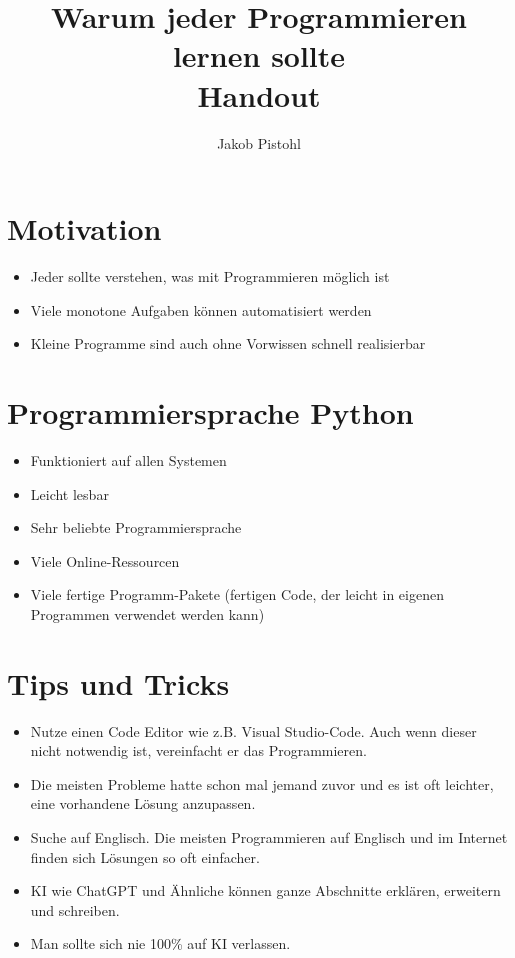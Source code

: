 \documentclass{article}
\title{
	\huge
	\textbf{Warum jeder Programmieren lernen sollte}
	\\ \LARGE{Handout}
}
\author{\large Jakob Pistohl}
\date{}
\begin{document}
\maketitle

\section{Motivation}

\begin{itemize}
	\item Jeder sollte verstehen, was mit Programmieren möglich ist
	\item Viele monotone Aufgaben können automatisiert werden
	\item Kleine Programme sind auch ohne Vorwissen schnell realisierbar
\end{itemize}

\section{Programmiersprache Python}

\begin{itemize}
	\item Funktioniert auf allen Systemen
	\item Leicht lesbar
	\item Sehr beliebte Programmiersprache
	\item Viele Online-Ressourcen
	\item Viele fertige Programm-Pakete (fertigen Code, der leicht in eigenen Programmen verwendet werden kann)
\end{itemize}

\section{Tips und Tricks}

\begin{itemize}
	\item Nutze einen Code Editor wie z.B. Visual Studio-Code. Auch wenn dieser nicht notwendig ist, vereinfacht er das Programmieren.
	\item Die meisten Probleme hatte schon mal jemand zuvor und es ist oft leichter, eine vorhandene Lösung anzupassen.
	\item Suche auf Englisch. Die meisten Programmieren auf Englisch und im Internet finden sich Lösungen so oft einfacher.
	\item KI wie ChatGPT und Ähnliche können ganze Abschnitte erklären, erweitern und schreiben.
	\item Man sollte sich nie 100\% auf KI verlassen.
\end{itemize}
\end{document}
